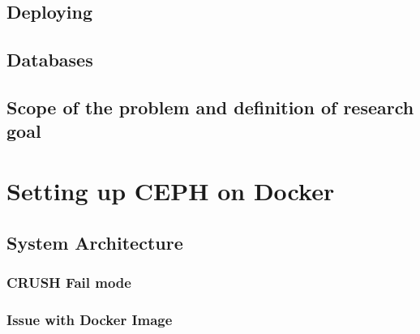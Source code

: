 \documentclass[titlepage, a4paper, 11pt]{scrartcl}
\begin{document}

        \subsection{Deploying}        


        \subsection{Databases}


        \subsection{Scope of the problem and definition of research goal}


    \section{Setting up CEPH on Docker}

        \subsection{System Architecture}


            \subsubsection{CRUSH Fail mode}




            \subsubsection{Issue with Docker Image}
\end{document}

